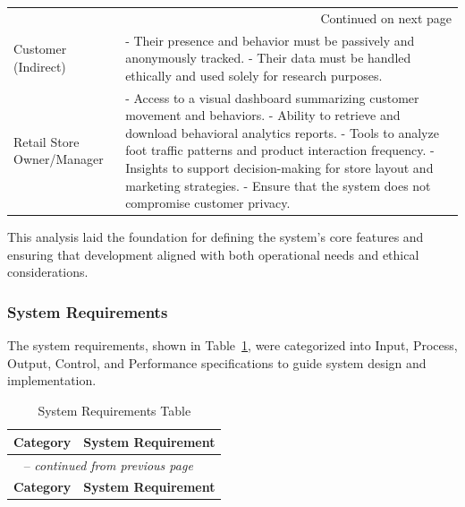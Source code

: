 {{\begin{longtable}{|p{4cm}|p{11cm}|}
		\hline \multicolumn{2}{r}{Continued on next page} \\
		\endfoot
		
		\hline
		\endlastfoot
		
		Customer (Indirect) & 
		- Their presence and behavior must be passively and anonymously tracked. \newline
		- Their data must be handled ethically and used solely for research purposes. \\
		\hline
		Retail Store Owner/Manager &
		- Access to a visual dashboard summarizing customer movement and behaviors. \newline
		- Ability to retrieve and download behavioral analytics reports. \newline
		- Tools to analyze foot traffic patterns and product interaction frequency. \newline
		- Insights to support decision-making for store layout and marketing strategies. \newline
		- Ensure that the system does not compromise customer privacy. \\
		\hline
	\end{longtable}
}

This analysis laid the foundation for defining the system’s core features and ensuring that development aligned with both operational needs and ethical considerations.

\subsubsection{System Requirements}
The system requirements, shown in Table~\ref{tab:system-requirements}, were categorized into Input, Process, Output, Control, and Performance specifications to guide system design and implementation.

{
\begin{longtable}{|p{4cm}|p{11cm}|}
		\caption[System Requirements]{\newline \newline System Requirements Table} \label{tab:system-requirements} \\
		\hline
		\textbf{Category} & \textbf{System Requirement} \\
		\hline
		\endfirsthead
		
		\multicolumn{2}{l}{\tablename\ \thetable{} -- \textit{continued from previous page}} \\
		\hline
		\textbf{Category} & \textbf{System Requirement} \\
		\hline
		\endhead
		

\end{longtable}}}
